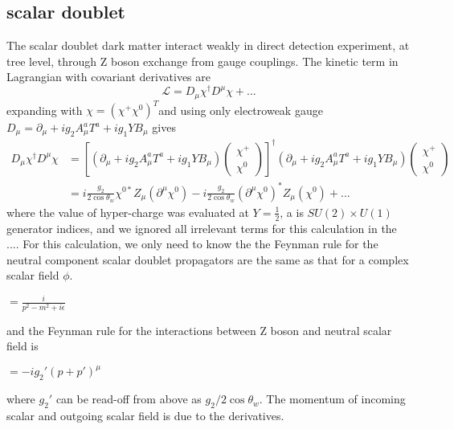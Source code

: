 \documentclass[12pt]{article}
\begin{document}
\subsection{scalar doublet}
The scalar doublet dark matter interact weakly in direct detection experiment, at tree level, through Z boson exchange from gauge couplings. 
The kinetic term in Lagrangian with covariant derivatives are 
$$
\mathcal L = D_\mu \chi ^\dagger D^\mu \chi + ...
$$
expanding with $\chi = ( \chi^+ \chi^0 )^T $and using only electroweak gauge 
$D_\mu = \partial_\mu + ig_2 A_\mu^a T^a + ig_1 Y B_\mu $
gives
\begin{equation}
\begin{aligned}
 D_\mu \chi ^\dagger D^\mu \chi 
 &= [(\partial_\mu + ig_2 A_\mu^a T^a + ig_1 Y B_\mu) \begin{pmatrix}
\chi^+  \\   
\chi^0
\end{pmatrix}
]^ \dagger
 (\partial_\mu + ig_2 A_\mu^a T^a + ig_1 Y B_\mu) \begin{pmatrix}
\chi^+  \\ \chi^0
\end{pmatrix}\\
&= i  \frac{g_2}{2\cos \theta_w}\chi^{0*} Z_\mu (\partial^\mu \chi^0 ) - i  \frac{g_2}{2\cos\theta_w} (\partial^\mu \chi^0 )^*Z_\mu ( \chi^0 ) + ...
\end{aligned}
\end{equation}
where the value of hyper-charge was evaluated at $Y=\frac{1}{2}$, a is $SU(2) \times U(1) $ generator indices, and we ignored all irrelevant terms for this calculation in the .... 
For this calculation, we only need to know the the Feynman rule for the neutral component scalar doublet propagators are the same as that for a complex scalar field $\phi$. 
\begin{center}
$= \frac{i}{p^2 - m^2 +i \epsilon}$ 
\end{center}
and the Feynman rule for the interactions between Z boson and neutral scalar field is 
\begin{center}
$= - i g_2' (p+p')^\mu$
\end{center}
where $g_2' $ can be read-off from above as $g_2 / 2\cos \theta_w$. The momentum of incoming scalar and outgoing scalar field is due to the derivatives.  
\end{document}
